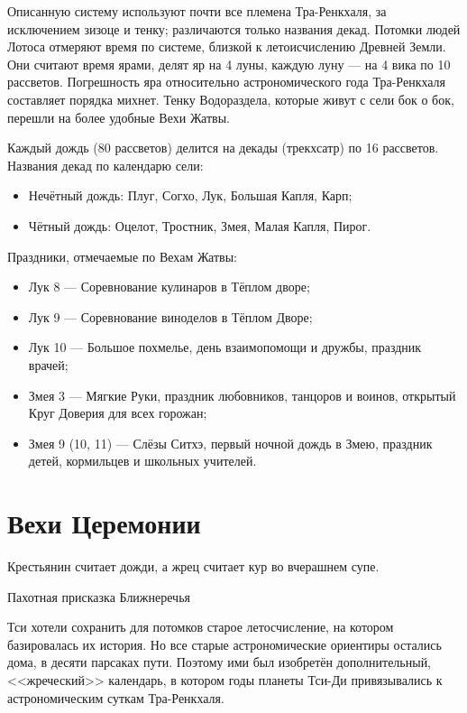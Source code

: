 Описанную систему используют почти все племена Тра-Ренкхаля, за исключением зизоце и тенку;
различаются только названия декад.
Потомки людей Лотоса отмеряют время по системе, близкой к летоисчислению Древней Земли.
Они считают время ярами, делят яр на 4 луны, каждую луну --- на 4 вика по 10 рассветов.
Погрешность яра относительно астрономического года Тра-Ренкхаля составляет порядка михнет.
Тенку Водораздела, которые живут с сели бок о бок, перешли на более удобные Вехи Жатвы.

Каждый дождь (80 рассветов) делится на декады (трекхсатр) по 16 рассветов.
Названия декад по календарю сели:

\begin{itemize}
\item Нечётный дождь: Плуг, Согхо, Лук, Большая Капля, Карп;
\item Чётный дождь: Оцелот, Тростник, Змея, Малая Капля, Пирог.
\end{itemize}

Праздники, отмечаемые по Вехам Жатвы:

\begin{itemize}
\item Лук 8 --- Соревнование кулинаров в Тёплом дворе;
\item Лук 9 --- Соревнование виноделов в Тёплом Дворе;
\item Лук 10 --- Большое похмелье, день взаимопомощи и дружбы, праздник врачей;
\item Змея 3 --- Мягкие Руки, праздник любовников, танцоров и воинов, открытый Круг Доверия для всех горожан;
\item Змея 9 (10, 11) --- Слёзы Ситхэ, первый ночной дождь в Змею, праздник детей, кормильцев и школьных учителей.
\end{itemize}


\section*{Вехи Церемонии}

\epigraph{
Крестьянин считает дожди, а жрец считает кур во вчерашнем супе.
}{
Пахотная присказка Ближнеречья
}

Тси хотели сохранить для потомков старое летосчисление, на котором базировалась их история.
Но все старые астрономические ориентиры остались дома, в десяти парсаках пути.
Поэтому ими был изобретён дополнительный, <<жреческий>> календарь, в котором годы планеты Тси-Ди привязывались к астрономическим суткам Тра-Ренкхаля.

